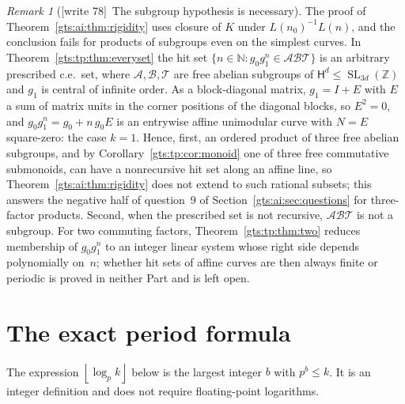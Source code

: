 \documentclass[11pt,letterpaper]{article}
\theoremstyle{definition}
\theoremstyle{remark}
\newtheorem{remark}[theorem]{Remark}
\newcommand{\Z}{\mathbb Z}
\newcommand{\N}{\mathbb N}
\newcommand{\SL}{\operatorname{SL}}
\newcommand{\HH}{\mathsf H}
\newcommand{\calA}{\mathcal A}
\newcommand{\calB}{\mathcal B}
\newcommand{\calT}{\mathcal T}
\newcommand{\floor}[1]{\left\lfloor #1\right\rfloor}
\newcommand{\wtagb}{\textup{[write 78]}}
\begin{document}
\begin{remark}[\wtagb\ The subgroup hypothesis is necessary]\label{gts:ai:rem:subgroup}
The proof of Theorem~\ref{gts:ai:thm:rigidity} uses closure of $K$ under $L(n_0)^{-1}L(n)$, and the conclusion fails for products of subgroups even on the simplest curves. In Theorem~\ref{gts:tp:thm:everyset} the hit set $\{n\in\N:g_0g_1^n\in\calA\calB\calT\}$ is an arbitrary prescribed c.e.\ set, where $\calA,\calB,\calT$ are free abelian subgroups of $\HH^d\le\SL_{3d}(\Z)$ and $g_1$ is central of infinite order. As a block-diagonal matrix, $g_1=I+E$ with $E$ a sum of matrix units in the corner positions of the diagonal blocks, so $E^2=0$, and $g_0g_1^n=g_0+n\,g_0E$ is an entrywise affine unimodular curve with $N=E$ square-zero: the case $k=1$. Hence, first, an ordered product of three free abelian subgroups, and by Corollary~\ref{gts:tp:cor:monoid} one of three free commutative submonoids, can have a nonrecursive hit set along an affine line, so Theorem~\ref{gts:ai:thm:rigidity} does not extend to such rational subsets; this answers the negative half of question~9 of Section~\ref{gts:ai:sec:questions} for three-factor products. Second, when the prescribed set is not recursive, $\calA\calB\calT$ is not a subgroup. For two commuting factors, Theorem~\ref{gts:tp:thm:two} reduces membership of $g_0g_1^n$ to an integer linear system whose right side depends polynomially on~$n$; whether hit sets of affine curves are then always finite or periodic is proved in neither Part and is left open.
\end{remark}

\section{The exact period formula}\label{gts:ai:sec:period}
The expression $\floor{\log_p k}$ below is the largest integer $b$ with $p^b\le k$. It is an integer definition and does not require floating-point logarithms.
\end{document}
